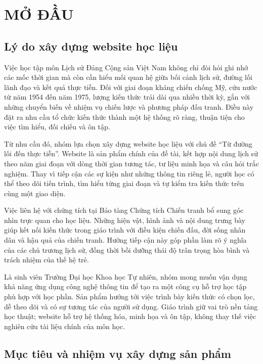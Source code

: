 \chapter{MỞ ĐẦU}

\section{Lý do xây dựng website học liệu}

Việc học tập môn Lịch sử Đảng Cộng sản Việt Nam không chỉ đòi hỏi ghi nhớ các mốc thời gian mà còn cần hiểu mối quan hệ giữa bối cảnh lịch sử, đường lối lãnh đạo và kết quả thực tiễn. Đối với giai đoạn kháng chiến chống Mỹ, cứu nước từ năm 1954 đến năm 1975, lượng kiến thức trải dài qua nhiều thời kỳ, gắn với những chuyển biến về nhiệm vụ chiến lược và phương pháp đấu tranh. Điều này đặt ra nhu cầu tổ chức kiến thức thành một hệ thống rõ ràng, thuận tiện cho việc tìm hiểu, đối chiếu và ôn tập.

Từ nhu cầu đó, nhóm lựa chọn xây dựng website học liệu với chủ đề “Từ đường lối đến thực tiễn”. Website là sản phẩm chính của đề tài, kết hợp nội dung lịch sử theo năm giai đoạn với dòng thời gian tương tác, tư liệu minh họa và câu hỏi trắc nghiệm. Thay vì tiếp cận các sự kiện như những thông tin riêng lẻ, người học có thể theo dõi tiến trình, tìm hiểu từng giai đoạn và tự kiểm tra kiến thức trên cùng một giao diện.

Việc liên hệ với chứng tích tại Bảo tàng Chứng tích Chiến tranh bổ sung góc nhìn trực quan cho học liệu. Những hiện vật, hình ảnh và nội dung trưng bày giúp kết nối kiến thức trong giáo trình với điều kiện chiến đấu, đời sống nhân dân và hậu quả của chiến tranh. Hướng tiếp cận này góp phần làm rõ ý nghĩa của các chủ trương lịch sử, đồng thời bồi dưỡng thái độ trân trọng hòa bình và trách nhiệm của thế hệ trẻ.

Là sinh viên Trường Đại học Khoa học Tự nhiên, nhóm mong muốn vận dụng khả năng ứng dụng công nghệ thông tin để tạo ra một công cụ hỗ trợ học tập phù hợp với học phần. Sản phẩm hướng tới việc trình bày kiến thức có chọn lọc, dễ theo dõi và có sự tương tác của người sử dụng. Giáo trình giữ vai trò nền tảng học thuật; website hỗ trợ hệ thống hóa, minh họa và ôn tập, không thay thế việc nghiên cứu tài liệu chính của môn học.

\section{Mục tiêu và nhiệm vụ xây dựng sản phẩm}


